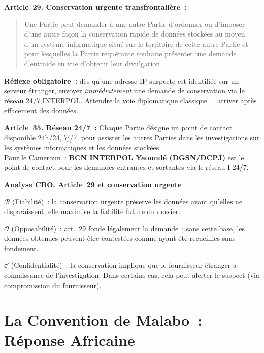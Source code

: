 \begin{boxjuris}
\textbf{Article~29. Conservation urgente transfrontalière~:}
\begin{quote}
Une Partie peut demander à une autre Partie d'ordonner ou d'imposer
d'une autre façon la conservation rapide de données stockées au moyen
d'un système informatique situé sur le territoire de cette autre
Partie et pour lesquelles la Partie requérante souhaite présenter une
demande d'entraide en vue d'obtenir leur divulgation.
\end{quote}
\textbf{Réflexe obligatoire~:} dès qu'une adresse IP suspecte est
identifiée sur un serveur étranger, envoyer \emph{immédiatement} une
demande de conservation via le réseau 24/7 INTERPOL. Attendre la voie
diplomatique classique = arriver après effacement des données.
\end{boxjuris}

\begin{boxjuris}
\textbf{Article~35. Réseau 24/7~:}
Chaque Partie désigne un point de contact disponible 24h/24, 7j/7,
pour assister les autres Parties dans les investigations sur les
systèmes informatiques et les données stockées.\\[0.3ex]
Pour le Cameroun~: \textbf{BCN INTERPOL Yaoundé (DGSN/DCPJ)} est le
point de contact pour les demandes entrantes et sortantes via le réseau
I-24/7.
\end{boxjuris}

\begin{boxCRO}
\textbf{Analyse CRO. Article~29 et conservation urgente}

$\mathcal{R}$ (Fiabilité)~: la conservation urgente préserve les données
avant qu'elles ne disparaissent, elle maximise la fiabilité future
du dossier.

$\mathcal{O}$ (Opposabilité)~: art.~29 fonde légalement la demande~;
sans cette base, les données obtenues peuvent être contestées comme
ayant été recueillies sans fondement.

$\mathcal{C}$ (Confidentialité)~: la conservation implique que le
fournisseur étranger a connaissance de l'investigation. Dans certains
cas, cela peut alerter le suspect (via compromission du fournisseur).

\end{boxCRO}

\section{La Convention de Malabo~: Réponse Africaine}
\label{sec:malabo}

